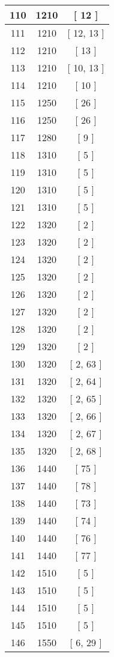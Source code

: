 \begin{center}
\begin{longtable}[H]{|| c c c ||}
\hline
110 & 1210 & [ 12 ] \\ 
\hline
111 & 1210 & [ 12, 13 ] \\ 
\hline
112 & 1210 & [ 13 ] \\ 
\hline
113 & 1210 & [ 10, 13 ] \\ 
\hline
114 & 1210 & [ 10 ] \\ 
\hline
115 & 1250 & [ 26 ] \\ 
\hline
116 & 1250 & [ 26 ] \\ 
\hline
117 & 1280 & [ 9 ] \\ 
\hline
118 & 1310 & [ 5 ] \\ 
\hline
119 & 1310 & [ 5 ] \\ 
\hline
120 & 1310 & [ 5 ] \\ 
\hline
121 & 1310 & [ 5 ] \\ 
\hline
122 & 1320 & [ 2 ] \\ 
\hline
123 & 1320 & [ 2 ] \\ 
\hline
124 & 1320 & [ 2 ] \\ 
\hline
125 & 1320 & [ 2 ] \\ 
\hline
126 & 1320 & [ 2 ] \\ 
\hline
127 & 1320 & [ 2 ] \\ 
\hline
128 & 1320 & [ 2 ] \\ 
\hline
129 & 1320 & [ 2 ] \\ 
\hline
130 & 1320 & [ 2, 63 ] \\ 
\hline
131 & 1320 & [ 2, 64 ] \\ 
\hline
132 & 1320 & [ 2, 65 ] \\ 
\hline
133 & 1320 & [ 2, 66 ] \\ 
\hline
134 & 1320 & [ 2, 67 ] \\ 
\hline
135 & 1320 & [ 2, 68 ] \\ 
\hline
136 & 1440 & [ 75 ] \\ 
\hline
137 & 1440 & [ 78 ] \\ 
\hline
138 & 1440 & [ 73 ] \\ 
\hline
139 & 1440 & [ 74 ] \\ 
\hline
140 & 1440 & [ 76 ] \\ 
\hline
141 & 1440 & [ 77 ] \\ 
\hline
142 & 1510 & [ 5 ] \\ 
\hline
143 & 1510 & [ 5 ] \\ 
\hline
144 & 1510 & [ 5 ] \\ 
\hline
145 & 1510 & [ 5 ] \\ 
\hline
146 & 1550 & [ 6, 29 ] \\ 

\end{longtable}
\end{center}

